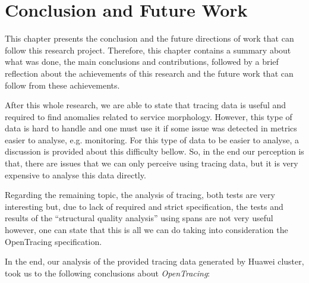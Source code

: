 \glsresetall
\chapter{Conclusion and Future Work}
\label{chap:conclusion_and_future_work}

This chapter presents the conclusion and the future directions of work that can follow this research project. Therefore, this chapter contains a summary about what was done, the main conclusions and contributions, followed by a brief reflection about the achievements of this research and the future work that can follow from these achievements.



After this whole research, we are able to state that tracing data is useful and required to find anomalies related to service morphology. However, this type of data is hard to handle and one must use it if some issue was detected in metrics easier to analyse, e.g. monitoring. For this type of data to be easier to analyse, a discussion is provided about this difficulty bellow. So, in the end our perception is that, there are issues that we can only perceive using tracing data, but it is very expensive to analyse this data directly.

Regarding the remaining topic, the analysis of tracing, both tests are very interesting but, due to lack of required and strict specification, the tests and results of the ``structural quality analysis'' using spans are not very useful however, one can state that this is all we can do taking into consideration the OpenTracing specification.


In the end, our analysis of the provided tracing data generated by Huawei cluster, took us to the following conclusions about \emph{OpenTracing}:

